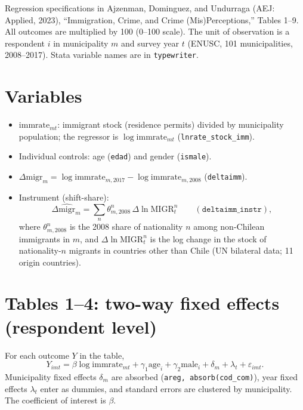 \documentclass{article}
\begin{document}
Regression specifications in Ajzenman, Dominguez, and Undurraga (AEJ: Applied, 2023), ``Immigration, Crime, and Crime (Mis)Perceptions,'' Tables 1--9. All outcomes are multiplied by 100 (0--100 scale). The unit of observation is a respondent \(i\) in municipality \(m\) and survey year \(t\) (ENUSC, 101 municipalities, 2008--2017). Stata variable names are in \texttt{typewriter}.

\section*{Variables}
\begin{itemize}
    \item \(\mathrm{immrate}_{mt}\): immigrant stock (residence permits) divided by municipality population; the regressor is \(\log \mathrm{immrate}_{mt}\) (\texttt{lnrate\_stock\_imm}).
    \item Individual controls: age (\texttt{edad}) and gender (\texttt{ismale}).
    \item \(\Delta \mathrm{migr}_{m} = \log\mathrm{immrate}_{m,2017} - \log\mathrm{immrate}_{m,2008}\) (\texttt{deltaimm}).
    \item Instrument (shift-share):
    \begin{equation*}
        \Delta\widehat{\mathrm{migr}}_{m} = \sum_n \theta^n_{m,2008}\,\Delta\ln \mathrm{MIGR}^n_t \qquad (\texttt{deltaimm\_instr}),
    \end{equation*}
    where \(\theta^n_{m,2008}\) is the 2008 share of nationality \(n\) among non-Chilean immigrants in \(m\), and \(\Delta\ln\mathrm{MIGR}^n_t\) is the log change in the stock of nationality-\(n\) migrants in countries other than Chile (UN bilateral data; 11 origin countries).
\end{itemize}

\section*{Tables 1--4: two-way fixed effects (respondent level)}
For each outcome \(Y\) in the table,
\begin{equation*}
    Y_{imt} = \beta \log\mathrm{immrate}_{mt} + \gamma_1 \mathrm{age}_{i} + \gamma_2 \mathrm{male}_{i} + \delta_m + \lambda_t + \varepsilon_{imt}.
\end{equation*}
Municipality fixed effects \(\delta_m\) are absorbed (\texttt{areg, absorb(cod\_com)}), year fixed effects \(\lambda_t\) enter as dummies, and standard errors are clustered by municipality. The coefficient of interest is \(\beta\).
\end{document}

